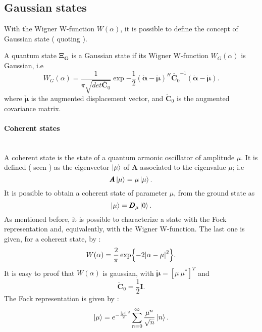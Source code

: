    \subsection{Gaussian states}
    With the Wigner W-function $W(\alpha)$, it is possible to define the concept of Gaussian state
    (\cite{tesiGuerrini} quoting \cite{Gaussian1,Gaussian2,Gaussian3,Gaussian4,Gaussian5}).
    \begin{definition}
        A quantum state $\pmb{\Xi_G}$ is a Gaussian state if its Wigner W-function $W_G(\alpha)$
        is Gaussian, i.e
        \begin{equation}
            W_G(\alpha)=\frac{1}{\pi\sqrt{det\check{\pmb{C}_0}}}\exp{
                -\frac{1}{2}(\check{\pmb{\alpha}}-\check{\pmb{\mu}})^H
                \check{\pmb{C}_0}^{-1}(\check{\pmb{\alpha}}-\check{\pmb{\mu}})}.
        \end{equation}
        where $\check{\pmb{\mu}} $ is the augmented displacement vector, and $\check{\pmb{C}}_0$ 
        is the augmented covariance matrix.
    \end{definition}

    \paragraph{Coherent states}\mbox{} \\
        A coherent state is the state of a quantum armonic oscillator of amplitude $\mu$.
        It is defined (\cite{tesiGuerrini} seen \cite{CohSt_Glauber,CohSt_Glauber2}) as the eigenvector $\ket{\mu}$ of $\pmb{A}$ 
        associated to the eigenvalue $\mu$; i.e
        \begin{equation}
            \pmb{A}\ket{\mu}=\mu\ket{\mu}.
        \end{equation}
        It is possible to obtain a coherent state of parameter $\mu$, from the ground state as
        \begin{equation}
            \ket{\mu}=\pmb{D}_\mu\ket{0}.
        \end{equation}
        As mentioned before, it is possible to characterize a state with the Fock representation
        and, equivalently, with the Wigner W-function. The last one is given, for a coherent state,
        by \cite{QuantumNoise}:
        \begin{equation}
            W(\alpha)=\frac{2}{\pi}\exp{-2\absolutevalue{\alpha-\mu}^2}.
        \end{equation}
        It is easy to proof that $W(\alpha)$ is gaussian, with $\check{\pmb{\mu}}=[\mu\ \mu^*]^T$ and
        \begin{equation*}
            \check{\pmb{C}}_0=\frac{1}{2}\pmb{I}.
        \end{equation*} 
        The Fock representation is given by \cite{Dowling}:
        \begin{equation}
            \ket{\mu}=e^{-\frac{\absolutevalue{\mu}}{2}^2}\sum_{n=0}^{\infty}
            \frac{\mu^n}{\sqrt{n}}\ket{n}.
        \end{equation}

